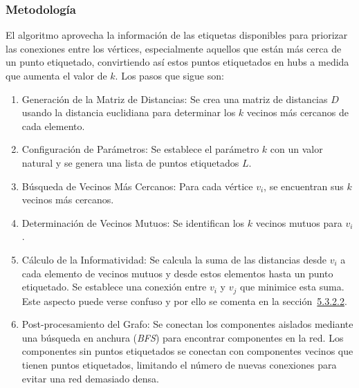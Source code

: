 \subsubsection{Metodología}
El algoritmo aprovecha la información de las etiquetas disponibles para priorizar las conexiones entre los vértices, especialmente aquellos que están más cerca de un punto etiquetado, convirtiendo así estos puntos etiquetados en hubs a medida que aumenta el valor de $k$.
Los pasos que sigue son:
\begin{enumerate}
	\item Generación de la Matriz de Distancias: Se crea una matriz de distancias $D$ usando la distancia euclidiana para determinar los $k$ vecinos más cercanos de cada elemento.
	\item Configuración de Parámetros: Se establece el parámetro $k$ con un valor natural y se genera una lista de puntos etiquetados	$L$.
	\item Búsqueda de Vecinos Más Cercanos: Para cada vértice $v_i$, se encuentran sus $k$ vecinos más cercanos.
	\item Determinación de Vecinos Mutuos: Se identifican los $k$ vecinos mutuos para $v_i$.
	\item Cálculo de la Informatividad: Se calcula la suma de las distancias desde $v_i$ a cada elemento de vecinos mutuos y desde estos elementos hasta un punto etiquetado. Se establece una conexión entre $v_i$ y $v_j$ que minimice esta suma. Este aspecto puede verse confuso y por ello se comenta en la sección~\hyperref[sec5:gbili]{5.3.2.2}.
	\item Post-procesamiento del Grafo: Se conectan los componentes aislados mediante una búsqueda en anchura (\textit{BFS}) para encontrar componentes en la red. Los componentes sin puntos etiquetados se conectan con componentes vecinos que tienen puntos etiquetados, limitando el número de nuevas conexiones para evitar una red demasiado densa.
\end{enumerate}


